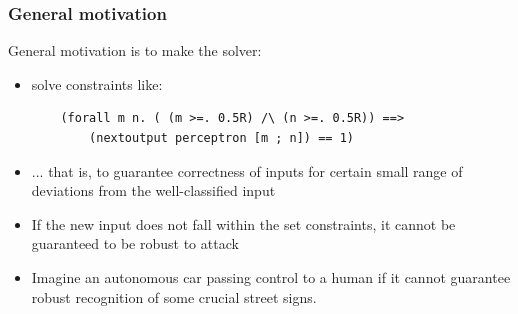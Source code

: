 \documentclass{beamer}
\begin{document}
                      
	
		\begin{frame}[fragile]
      \frametitle{General motivation}
			
			General motivation is to make  the solver:
			
			
			\begin{itemize}
				\item solve constraints like:			
			\begin{verbatim}
	(forall m n. ( (m >=. 0.5R) /\ (n >=. 0.5R)) ==> 
	    (nextoutput perceptron [m ; n]) == 1)
	\end{verbatim}
	\pause \item ... that is, to guarantee correctness of inputs for certain small range of deviations from the well-classified input
	\pause \item If the new input does not fall within the set constraints, it cannot be guaranteed to be robust to attack
	\pause \item Imagine an autonomous car passing control to a human if it cannot guarantee robust recognition of some crucial street signs. 

			\end{itemize}
	\end{frame}
	
\end{document}
